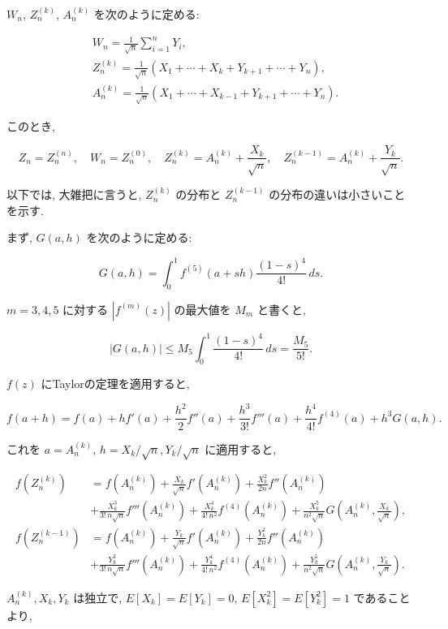 \documentclass[
  letterpaper,
  DIV=11,
  numbers=noendperiod]{scrartcl}
\begin{document}
\(W_n\), \(Z_n^{(k)}\), \(A_n^{(k)}\) を次のように定める:

\[
\begin{aligned}
&
W_n = \frac{1}{\sqrt{n}} \sum_{i=1}^n Y_i,
\\ &
Z_n^{(k)} = \frac{1}{\sqrt{n}}(X_1+\cdots+X_k+Y_{k+1}+\cdots+Y_n),
\\ &
A_n^{(k)} = \frac{1}{\sqrt{n}}(X_1+\cdots+X_{k-1}+Y_{k+1}+\cdots+Y_n).
\end{aligned}
\]

このとき,

\[
Z_n = Z_n^{(n)}, \quad
W_n = Z_n^{(0)}, \quad
Z_n^{(k)} = A_n^{(k)} + \frac{X_k}{\sqrt{n}}, \quad
Z_n^{(k-1)} = A_n^{(k)} + \frac{Y_k}{\sqrt{n}}.
\]

以下では, 大雑把に言うと, \(Z_n^{(k)}\) の分布と \(Z_n^{(k-1)}\)
の分布の違いは小さいことを示す.

まず, \(G(a,h)\) を次のように定める:

\[
G(a, h) = \int_0^1 f^{(5)}(a + sh)\frac{(1-s)^4}{4!}\,ds.
\]

\(m=3,4,5\) に対する \(|f^{(m)}(z)|\) の最大値を \(M_m\) と書くと,

\[
|G(a,h)| \le M_5 \int_0^1 \frac{(1-s)^4}{4!}\,ds = \frac{M_5}{5!}.
\]

\(f(z)\) にTaylorの定理を適用すると,

\[
f(a+h) =
f(a) + h f'(a) + \frac{h^2}{2}f''(a) +
\frac{h^3}{3!}f'''(a) + \frac{h^4}{4!}f^{(4)}(a) +
h^3 G(a, h).
\]

これを \(a = A_n^{(k)}\), \(h = X_k/\sqrt{n}, Y_k/\sqrt{n}\)
に適用すると,

\[
\begin{aligned}
f(Z_n^{(k)}) &=
f(A_n^{(k)}) +
\frac{X_k}{\sqrt{n}} f'(A_n^{(k)}) + \frac{X_k^2}{2n}f''(A_n^{(k)}) 
\\ &+
\frac{X_k^3}{3!\,n\sqrt{n}}f'''(A_n^{(k)}) + \frac{X_k^4}{4!\,n^2}f^{(4)}(A_n^{(k)}) +
\frac{X_k^5}{n^2\sqrt{n}} G\left(A_n^{(k)}, \frac{X_k}{\sqrt{n}}\right),
\\
f(Z_n^{(k-1)}) &=
f(A_n^{(k)}) +
\frac{Y_k}{\sqrt{n}} f'(A_n^{(k)}) + \frac{Y_k^2}{2n}f''(A_n^{(k)}) 
\\ &+
\frac{Y_k^3}{3!\,n\sqrt{n}}f'''(A_n^{(k)}) + \frac{Y_k^4}{4!\,n^2}f^{(4)}(A_n^{(k)}) +
\frac{Y_k^5}{n^2\sqrt{n}} G\left(A_n^{(k)}, \frac{Y_k}{\sqrt{n}}\right).
\end{aligned}
\]

\(A_n^{(k)}, X_k, Y_k\) は独立で, \(E[X_k]=E[Y_k]=0\),
\(E[X_k^2]=E[Y_k^2]=1\) であることより,
\end{document}
